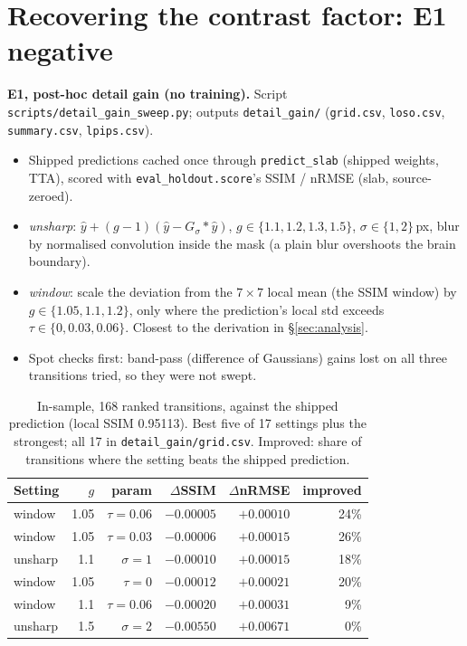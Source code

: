 \documentclass[10pt,a4paper]{article}
\begin{document}
\section{Recovering the contrast factor: E1 negative}\label{sec:next}

\textbf{E1, post-hoc detail gain (no training).} Script \texttt{scripts/detail\_gain\_sweep.py};
outputs \texttt{detail\_gain/} (\texttt{grid.csv}, \texttt{loso.csv}, \texttt{summary.csv},
\texttt{lpips.csv}).
\begin{itemize}
  \item Shipped predictions cached once through \texttt{predict\_slab} (shipped weights, TTA),
        scored with \texttt{eval\_holdout.score}'s SSIM / nRMSE (slab, source-zeroed).
  \item \emph{unsharp}: $\hat y + (g-1)(\hat y - G_\sigma * \hat y)$, $g \in \{1.1, 1.2, 1.3,
        1.5\}$, $\sigma \in \{1, 2\}$\,px, blur by normalised convolution inside the mask (a plain
        blur overshoots the brain boundary).
  \item \emph{window}: scale the deviation from the $7\times7$ local mean (the SSIM window) by
        $g \in \{1.05, 1.1, 1.2\}$, only where the prediction's local std exceeds
        $\tau \in \{0, 0.03, 0.06\}$. Closest to the derivation in \S\ref{sec:analysis}.
  \item Spot checks first: band-pass (difference of Gaussians) gains lost on all three
        transitions tried, so they were not swept.
\end{itemize}

\begin{table}[H]
\centering\small
\begin{tabular}{lrrrrr}
\toprule
Setting & $g$ & param & $\Delta$SSIM & $\Delta$nRMSE & improved \\
\midrule
window  & 1.05 & $\tau = 0.06$ & $-0.00005$ & $+0.00010$ & 24\% \\
window  & 1.05 & $\tau = 0.03$ & $-0.00006$ & $+0.00015$ & 26\% \\
unsharp & 1.1  & $\sigma = 1$  & $-0.00010$ & $+0.00015$ & 18\% \\
window  & 1.05 & $\tau = 0$    & $-0.00012$ & $+0.00021$ & 20\% \\
window  & 1.1  & $\tau = 0.06$ & $-0.00020$ & $+0.00031$ & 9\% \\
unsharp & 1.5  & $\sigma = 2$  & $-0.00550$ & $+0.00671$ & 0\% \\
\bottomrule
\end{tabular}
\caption{In-sample, 168 ranked transitions, against the shipped prediction (local SSIM 0.95113).
Best five of 17 settings plus the strongest; all 17 in \texttt{detail\_gain/grid.csv}.
Improved: share of transitions where the setting beats the shipped prediction.}
\label{tab:e1}
\end{table}
\end{document}
